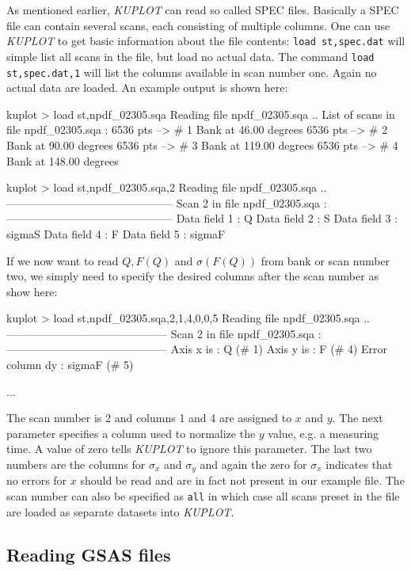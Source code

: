 As mentioned earlier, {\it KUPLOT} can read so called SPEC files.
Basically a SPEC file can contain several scans, each consisting of
multiple columns. One can use {\it KUPLOT} to get basic information
about the file contents: {\tt load st,spec.dat} will simple list all
scans in the file, but load no actual data. The command {\tt load
st,spec.dat,1} will list the columns available in scan number one.
Again no actual data are loaded. An example output is shown here:
%
\begin{MacVerbatim}
   kuplot > load st,npdf_02305.sqa
   Reading file npdf_02305.sqa ..
   List of scans in file npdf_02305.sqa :
     6536 pts --> #   1 Bank at   46.00 degrees
     6536 pts --> #   2 Bank at   90.00 degrees
     6536 pts --> #   3 Bank at  119.00 degrees
     6536 pts --> #   4 Bank at  148.00 degrees

   kuplot > load st,npdf_02305.sqa,2
   Reading file npdf_02305.sqa ..
   ---------------------------------------------
   Scan    2 in file npdf_02305.sqa :
   ---------------------------------------------
     Data field    1 : Q
     Data field    2 : S
     Data field    3 : sigmaS
     Data field    4 : F
     Data field    5 : sigmaF
\end{MacVerbatim}
%
If we now want to read $Q, F(Q)$ and $\sigma(F(Q))$ from bank or
scan number two, we simply need to specify the desired columns after
the scan number as show here:
%
\begin{MacVerbatim}
   kuplot > load st,npdf_02305.sqa,2,1,4,0,0,5
   Reading file npdf_02305.sqa ..
   --------------------------------------------
   Scan    2 in file npdf_02305.sqa :
   --------------------------------------------
     Axis x is       :               Q (#   1)
     Axis y is       :               F (#   4)
     Error column dy :          sigmaF (#   5)

   ...
\end{MacVerbatim}
%
The scan number is 2 and columns 1 and 4 are assigned to $x$ and
$y$. The next parameter specifies a column used to normalize the $y$
value, e.g. a measuring time. A value of zero tells {\it KUPLOT} to
ignore this parameter. The last two numbers are the columns for
$\sigma_x$ and $\sigma_y$ and again the zero for $\sigma_x$
indicates that no errors for $x$ should be read and are in fact not
present in our example file. The scan number can also be specified
as {\tt all} in which case all scans preset in the file are loaded
as separate datasets into {\it KUPLOT}.

\subsection*{Reading GSAS files}

